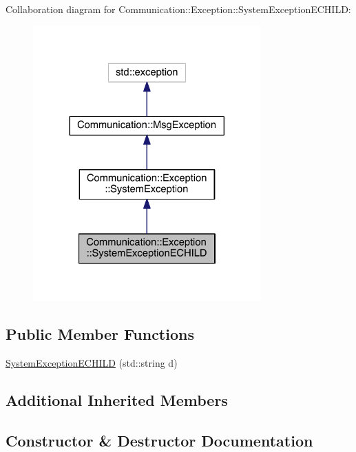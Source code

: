 Collaboration diagram for Communication\+:\+:Exception\+:\+:System\+Exception\+E\+C\+H\+I\+L\+D\+:\nopagebreak
\begin{figure}[H]
\begin{center}
\leavevmode
\includegraphics[width=248pt]{class_communication_1_1_exception_1_1_system_exception_e_c_h_i_l_d__coll__graph}
\end{center}
\end{figure}
\subsection*{Public Member Functions}
\begin{DoxyCompactItemize}
\item 
\hyperlink{class_communication_1_1_exception_1_1_system_exception_e_c_h_i_l_d_a54f76c38c2af58e76ce1705f1e384764}{System\+Exception\+E\+C\+H\+I\+L\+D} (std\+::string d)
\end{DoxyCompactItemize}
\subsection*{Additional Inherited Members}


\subsection{Constructor \& Destructor Documentation}
\hypertarget{class_communication_1_1_exception_1_1_system_exception_e_c_h_i_l_d_a54f76c38c2af58e76ce1705f1e384764}{}
